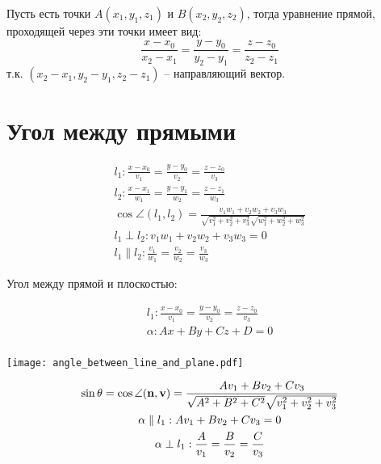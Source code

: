 

\begin{definition}
    Пусть есть точки $A(x_1, y_1, z_1)$ и $B(x_2, y_2, z_2)$, тогда уравнение прямой, проходящей через эти точки имеет вид:
    \[\frac{x-x_0}{x_2-x_1} = \frac{y-y_0}{y_2-y_1} = \frac{z-z_0}{z_2-z_1}\]
    т.к. $(x_2-x_1, y_2-y_1, z_2-z_1)$ -- направляющий вектор.
\end{definition}


\section{Угол между прямыми}

\begin{definition}
    \begin{gather*}
        l_1: \frac{x-x_0}{v_1} = \frac{y-y_0}{v_2} = \frac{z-z_0}{v_3}\\
        l_2: \frac{x-x_1}{w_1} = \frac{y-y_1}{w_2} = \frac{z-z_1}{w_3}\\
        \cos\angle(l_1, l_2) = \frac{v_1 w_1 + v_2 w_2 + v_3 w_3}
        {\sqrt{v_1^2+v_2^2+v_3^2} \sqrt{w_1^2+w_2^2+w_3^2}}\\
        l_1 \perp l_2: v_1 w_1 + v_2 w_2 + v_3 w_3  = 0\\
        l_1 \parallel l_2: \frac{v_1}{w_1} = \frac{v_2}{w_2} = \frac{v_3}{w_3}
    \end{gather*}
\end{definition}

Угол между прямой и плоскостью: \\
\noindent\begin{minipage}{0.45\textwidth}
    \begin{gather*}
        l_1: \frac{x-x_0}{v_1} = \frac{y-y_0}{v_2} = \frac{z-z_0}{v_3}\\
        \alpha: Ax+By+Cz+D=0\\
    \end{gather*}
\end{minipage}
\begin{minipage}{0.45\textwidth}
    \begin{center}
        \texttt{[image: angle\_between\_line\_and\_plane.pdf]}
    \end{center}
\end{minipage}
\begin{gather*}
    \sin\theta = \cos \angle (\mathbf{n}, \mathbf{v}) = \frac{Av_1 + Bv_2 + Cv_3}
    {\sqrt{A^2+B^2+C^2} \sqrt{v_1^2+v_2^2+v_3^2}}\\
    \alpha \parallel l_1: Av_1 + Bv_2 + Cv_3 = 0\\
    \alpha \perp l_1: \frac{A}{v_1} = \frac{B}{v_2} = \frac{C}{v_3}
\end{gather*}

